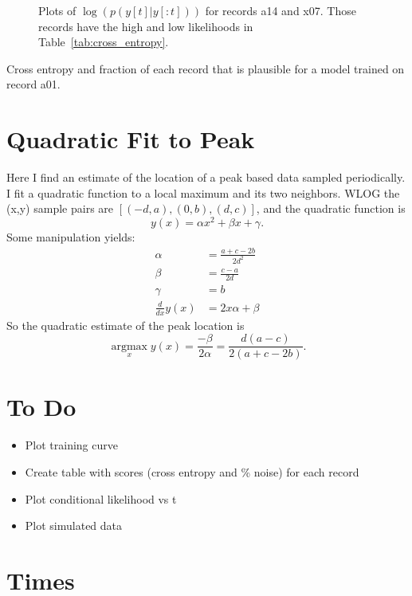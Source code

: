 \documentclass[12pt]{article}
\newcommand{\argmax}{\operatorname*{argmax}}
\begin{document}
\begin{figure}
  \centering
  \caption{Plots of $\log\left(p(y[t]|y[:t]) \right)$ for records a14
    and x07.  Those records have the high and low likelihoods in
    Table~\ref{tab:cross_entropy}.}
  \label{fig:train_log.pdf}
\end{figure}

\begin{table}
  \centering
    
  \caption[Cross Entropy]{Cross entropy and fraction of each record
    that is plausible for a model trained on record a01.}
  \label{tab:cross_entropy}
\end{table}

\section{Quadratic Fit to Peak}
\label{sec:quadratic}

Here I find an estimate of the location of a peak based data sampled
periodically.  I fit a quadratic function to a local maximum and its
two neighbors.  WLOG the (x,y) sample pairs are $[(-d,a), (0,b),
(d,c)]$, and the quadratic function is
\begin{equation*}
  y(x) = \alpha x^2 + \beta x + \gamma.
\end{equation*}
Some manipulation yields:
\begin{align*}
  \alpha &= \frac{a+c-2b}{2d^2} \\
  \beta &= \frac{c-a}{2d} \\
  \gamma &= b \\
  \frac{d}{dx} y(x) &= 2x\alpha + \beta
\end{align*}
So the quadratic estimate of the peak location is
\begin{equation*}
  \argmax_x y(x) = \frac{-\beta}{2\alpha} = \frac{d(a-c)}{2(a+c-2b)}.
\end{equation*}

\section{To Do}
\label{sec:todo}

\begin{itemize}
\item Plot training curve
\item Create table with scores (cross entropy and \% noise) for each
  record
\item Plot conditional likelihood vs t
\item Plot simulated data
\end{itemize}
\section{Times}
\label{sec:times}
\end{document}
